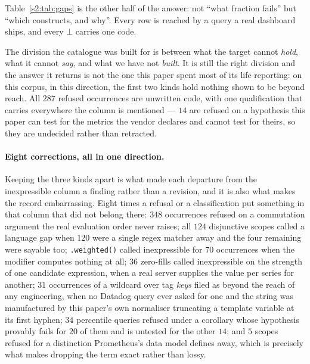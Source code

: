 Table~\ref{s2:tab:gaps} is the other half of the answer: not ``what fraction fails'' but
``which constructs, and why''. Every row is reached by a query a real dashboard ships, and
every $\bot$ carries one code.

\begin{table}[htbp]\centering\scriptsize

\caption{The complete gap catalogue for the forward direction. Five codes account for
every refusal. Shares are of all $8{,}770$ Datadog query occurrences in the corpus.}
\label{s2:tab:gaps}
\end{table}

The division the catalogue was built for is between what the target cannot \emph{hold},
what it cannot \emph{say}, and what we have not \emph{built}. It is still the right division
and the answer it returns is not the one this paper spent most of its life reporting: on
this corpus, in this direction, the first two kinds hold nothing shown to be beyond reach.
All $287$ refused occurrences are unwritten code, with one qualification that carries
everywhere the column is mentioned --- $14$ are refused on a hypothesis this paper can test
for the metrics the vendor declares and cannot test for theirs, so they are undecided rather
than retracted.

\paragraph{Eight corrections, all in one direction.}
Keeping the three kinds apart is what made each departure from the inexpressible column a
finding rather than a revision, and it is also what makes the record embarrassing. Eight
times a refusal or a classification put something in that column that did not belong
there: $348$ occurrences refused on a commutation argument the real evaluation order never
raises; all $124$ disjunctive scopes called a language gap when $120$ were a single regex
matcher away and the four remaining were sayable too; \texttt{.weighted()} called
inexpressible for $70$ occurrences when the modifier computes nothing at all; $36$
zero-fills called inexpressible on the strength of one candidate expression, when a real
server supplies the value per series for another; $31$ occurrences of a wildcard over tag
\emph{keys} filed as beyond the reach of any engineering, when no Datadog query ever asked
for one and the string was manufactured by this paper's own normaliser truncating a
template variable at its first hyphen; $34$ percentile queries refused under a corollary
whose hypothesis provably fails for $20$ of them and is untested for the other $14$; and
$5$ scopes refused for a distinction Prometheus's data model defines away, which is
precisely what makes dropping the term exact rather than lossy.


